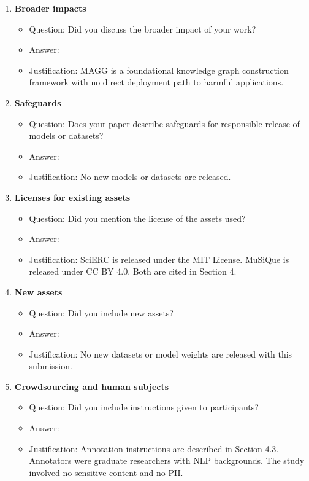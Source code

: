 \documentclass{article}
\begin{document}
\begin{enumerate}
\item {\bf Broader impacts}
\begin{itemize}
\item[] Question: Did you discuss the broader impact of your work?
\item[] Answer: \answerNo{}
\item[] Justification: MAGG is a foundational knowledge graph construction framework with no direct deployment path to harmful applications.
\end{itemize}

\item {\bf Safeguards}
\begin{itemize}
\item[] Question: Does your paper describe safeguards for responsible release of models or datasets?
\item[] Answer: \answerNA{}
\item[] Justification: No new models or datasets are released.
\end{itemize}

\item {\bf Licenses for existing assets}
\begin{itemize}
\item[] Question: Did you mention the license of the assets used?
\item[] Answer: \answerYes{}
\item[] Justification: SciERC is released under the MIT License. MuSiQue is released under CC BY 4.0. Both are cited in Section 4.
\end{itemize}

\item {\bf New assets}
\begin{itemize}
\item[] Question: Did you include new assets?
\item[] Answer: \answerNA{}
\item[] Justification: No new datasets or model weights are released with this submission.
\end{itemize}

\item {\bf Crowdsourcing and human subjects}
\begin{itemize}
\item[] Question: Did you include instructions given to participants?
\item[] Answer: \answerYes{}
\item[] Justification: Annotation instructions are described in Section 4.3. Annotators were graduate researchers with NLP backgrounds. The study involved no sensitive content and no PII.
\end{itemize}


\end{enumerate}
\end{document}
